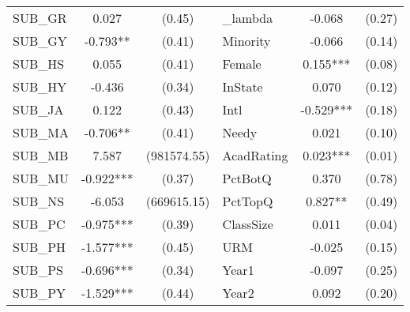 \begin{table}[htb]
\begin{threeparttable}
\begin{tabular}{l c c|l c c}
    SUB\_GR                                      & 0.027                      & (0.45)               & \_lambda            & -0.068                 & (0.27)               \\
    SUB\_GY                                      & -0.793**                   & (0.41)               & Minority            & -0.066                 & (0.14)               \\
    SUB\_HS                                      & 0.055                      & (0.41)               & Female              & 0.155***               & (0.08)               \\
    SUB\_HY                                      & -0.436                     & (0.34)               & InState             & 0.070                  & (0.12)               \\
    SUB\_JA                                      & 0.122                      & (0.43)               & Intl                & -0.529***              & (0.18)               \\
    SUB\_MA                                      & -0.706**                   & (0.41)               & Needy               & 0.021                  & (0.10)               \\
    SUB\_MB                                      & 7.587                      & (981574.55)          & AcadRating          & 0.023***               & (0.01)               \\
    SUB\_MU                                      & -0.922***                  & (0.37)               & PctBotQ             & 0.370                  & (0.78)               \\
    SUB\_NS                                      & -6.053                     & (669615.15)          & PctTopQ             & 0.827**                & (0.49)               \\
    SUB\_PC                                      & -0.975***                  & (0.39)               & ClassSize           & 0.011                  & (0.04)               \\
    SUB\_PH                                      & -1.577***                  & (0.45)               & URM                 & -0.025                 & (0.15)               \\
    SUB\_PS                                      & -0.696***                  & (0.34)               & Year1               & -0.097                 & (0.25)               \\
    SUB\_PY                                      & -1.529***                  & (0.44)               & Year2               & 0.092                  & (0.20)               \\

\end{tabular}
\end{threeparttable}
\end{table}
